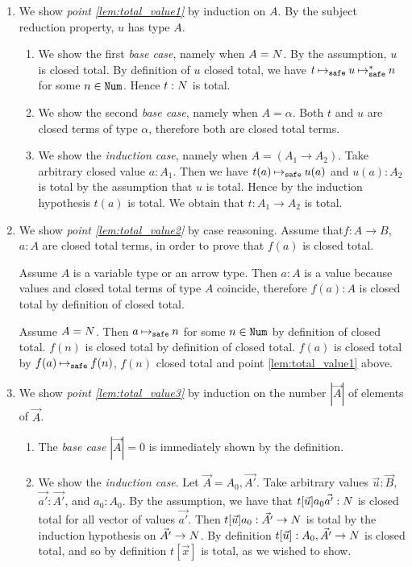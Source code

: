 \documentclass{article}
\newenvironment{proof}[1][Proof]{\begin{trivlist}
\item[\hskip \labelsep {\bfseries #1}]}{\end{trivlist}}
\begin{document}
\begin{proof}
\begin{enumerate}

\item
  We show \emph{point \ref{lem:total_value1}}  by induction on $A$. 
By the subject reduction property, $u$ has type $A$.
\begin{enumerate}
\item
  We show the first \emph{base case}, namely when $A ={N}$.
  By the assumption, $u$ is closed total.
  By definition of $u$ closed total, 
  we have $t \mathbin{\mathbin{\mapsto}_{\hbox{\scriptsize \tt safe}}} u \mathbin{\mathbin{\mapsto}_{\hbox{\scriptsize \tt safe}}^*} n$ for some $n\in{\tt Num}$. 
  Hence $t:{N}$ is total.
\item
  We show the second \emph{base case}, namely when $A =\alpha$.
  Both $t$ and $u$ are closed terms of type $\alpha$, therefore both are closed total terms.
\item
  We show the \emph{induction case}, namely when $A = (A_1\rightarrow A_2)$.
  Take arbitrary closed value $a:A_1$. Then we have $t(a) \mathbin{\mathbin{\mapsto}_{\hbox{\scriptsize \tt safe}}} u(a)$ and 
  $u(a):A_2$ is total by the assumption that $u$ is total.
  Hence by the induction hypothesis $t(a)$ is total. 
  We obtain that $t:A_1\rightarrow A_2$ is total. 
\end{enumerate}

  \item
We show \emph{point \ref{lem:total_value2}} by case reasoning.
Assume that$f:A \rightarrow B$, $a:A$ are closed total terms, in order to prove
that $f(a)$  is closed total.

Assume $A$ is a variable type or an arrow type. 
Then $a:A$ is a value because values and closed total terms of type $A$
coincide, therefore $f(a):A$ is closed total by definition of closed total.

Assume $A={N}$. Then $a \mathbin{\mathbin{\mapsto}_{\hbox{\scriptsize \tt safe}}} n$ for some $n \in {\tt Num}$ by definition of closed total.
$f(n)$ is closed total by definition of closed total. $f(a)$ is closed total by $f(a) \mathbin{\mathbin{\mapsto}_{\hbox{\scriptsize \tt safe}}} f(n)$,
$f(n)$ closed total and point \ref{lem:total_value1} above.

\item  
We show \emph{point \ref{lem:total_value3}} by induction on the number $|\vec{A}|$ of
elements of $\vec{A}$.
\begin{enumerate}
\item
  The \emph{base case} $|\vec{A}| = 0$ is immediately shown by the definition.
\item
  We show the \emph{induction case}. Let $\vec{A} = A_0,\vec{A'}$.
  Take arbitrary values $\vec{u}:\vec{B}$, $\vec{a'}:\vec{A'}$, and $a_0:A_0$. 
  By the assumption, we have that $t[\vec{u}]a_0\vec{a'}:{N}$ is closed total for all 
  vector of values $\vec{a'}$. 
  Then $t[\vec{u}]a_0:\vec{A'}\rightarrow{N}$ is total 
  by the induction hypothesis on $\vec{A'}\rightarrow {N}$.
  By definition $t[\vec{u}] : A_0,\vec{A'}\rightarrow{N}$ is closed total,
  and so by definition $t[\vec{x}]$ is total, as we wished to show.
\end{enumerate}

\end{enumerate}
\end{proof}
\end{document}
